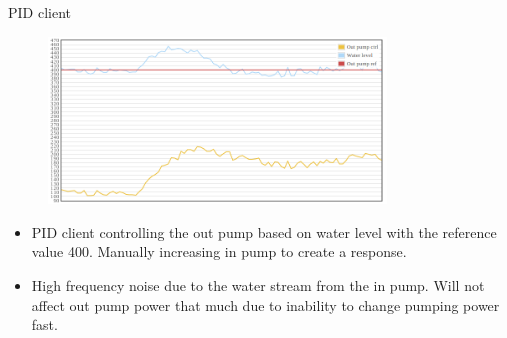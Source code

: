 \documentclass{beamer}
\begin{document}
\begin{frame}{PID client}
	\begin{figure}
		\center
		\includegraphics[width=0.8\textwidth]{plot1.png}
	\end{figure}
	\begin{itemize}
		\item PID client controlling the out pump based on water level with the reference value 400. Manually increasing in pump to create a response.
		\item High frequency noise due to the water stream from the in pump. Will not affect out pump power that much due to inability to change pumping power fast.
    \end{itemize}
\end{frame}
\end{document}
